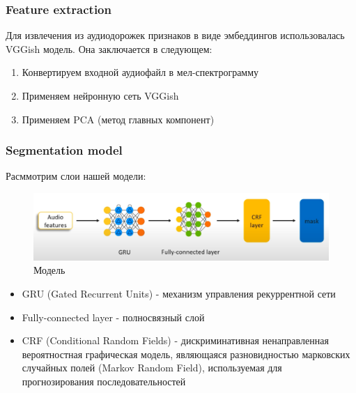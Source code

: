 \subsubsection{Feature extraction}
    Для извлечения из аудиодорожек признаков в виде эмбеддингов использовалась VGGish модель. Она заключается в следующем:
    \begin{enumerate}
        \item Конвертируем входной аудиофайл в мел-спектрограмму
        \item Применяем нейронную сеть VGGish
        \item Применяем PCA (метод главных компонент)
    \end{enumerate}
    
\subsubsection{Segmentation model}
    Расммотрим слои нашей модели:
    \begin{figure}[H]
        \centering
        \includegraphics[scale=0.5]{images/model.PNG}
        \caption{Модель}
        \label{model}
    \end{figure}
    \begin{itemize}
        \item GRU (Gated Recurrent Units) - механизм управления рекуррентной сети
        \item Fully-connected layer - полносвязный слой
        \item CRF (Conditional Random Fields) - дискриминативная ненаправленная вероятностная графическая модель, являющаяся разновидностью марковских случайных полей (Markov Random Field), используемая для прогнозирования последовательностей
    \end{itemize}
